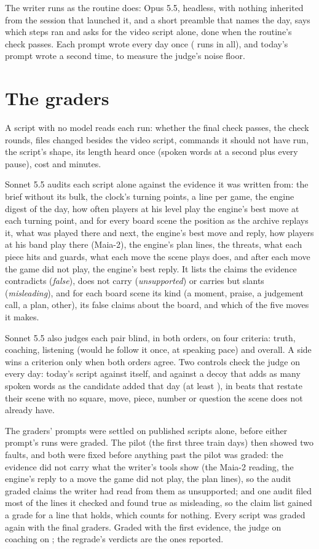 \documentclass[11pt]{article}
\begin{document}
The writer runs as the routine does: Opus 5.5, headless, with nothing inherited from the session
that launched it, and a short preamble that names the day, says which steps ran and asks for the
video script alone, done when the routine's check passes. Each prompt wrote every day once
(\WriterRuns{} runs in all), and today's prompt wrote \NullDays{} a second time, to measure the
judge's noise floor.

\section{The graders}

A script with no model reads each run: whether the final check passes, the check rounds, files
changed besides the video script, commands it should not have run, the script's shape, its length
heard once (spoken words at \WordsPerSecond{} a second plus every pause), cost and minutes.

Sonnet 5.5 audits each script alone against the evidence it was written from: the brief without its
bulk, the clock's turning points, a line per game, the engine digest of the day, how often players
at his level play the engine's best move at each turning point, and for every board scene the
position as the archive replays it, what was played there and next, the engine's best move and
reply, how players at his band play there (Maia-2), the engine's plan lines, the threats, what each
piece hits and guards, what each move the scene plays does, and after each move the game did not
play, the engine's best reply. It lists the claims the evidence contradicts (\emph{false}), does not
carry (\emph{unsupported}) or carries but slants (\emph{misleading}), and for each board scene its
kind (a moment, praise, a judgement call, a plan, other), its false claims about the board, and
which of the five moves it makes.

Sonnet 5.5 also judges each pair blind, in both orders, on four criteria: truth, coaching, listening
(would he follow it once, at speaking pace) and overall. A side wins a criterion only when both
orders agree. Two controls check the judge on every day: today's script against itself, and against
a decoy that adds as many spoken words as the candidate added that day (at least \MinDecoyWords), in beats that
restate their scene with no square, move, piece, number or question the scene does not already
have.

The graders' prompts were settled on published scripts alone, before either prompt's runs were
graded. The pilot (the first three train days) then showed two faults, and both were fixed before
anything past the pilot was graded: the evidence did not carry what the writer's tools show (the
Maia-2 reading, the engine's reply to a move the game did not play, the plan lines), so the audit
graded claims the writer had read from them as unsupported; and one audit filed most of the lines
it checked and found true as misleading, so the claim list gained a grade for a line that holds,
which counts for nothing. Every script was graded again with the final graders. Graded with the
first evidence, the judge \FirstCoaching{} on coaching on \FirstGradedDay; the regrade's verdicts
are the ones reported.
\end{document}
